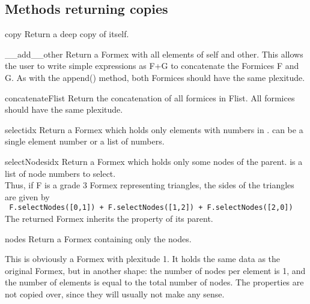 {{\subsection{Methods returning copies}

\begin{methoddesc}{copy}{}
Return a deep copy of itself.
\end{methoddesc}


\begin{methoddesc}{__add__}{other}
Return a Formex with all elements of self and other. This allows the user to write simple expressions as F+G to concatenate the Formices F and G. As with the append() method, both Formices should have the same plexitude.
\end{methoddesc}


\begin{methoddesc}{concatenate}{Flist}
Return the concatenation of all formices in Flist. All formices should have the same plexitude. \classmethod 
\end{methoddesc}


\begin{methoddesc}{select}{idx}
Return a Formex which holds only elements with numbers in .
 can be a single element number or a list of numbers.
\end{methoddesc}

\begin{methoddesc}{selectNodes}{idx}
Return a Formex which holds only some nodes of the parent.  is a list of node numbers to select.\\
Thus, if F is a grade 3 Formex representing triangles, the sides of the triangles are given by\\
\verb? F.selectNodes([0,1]) + F.selectNodes([1,2]) + F.selectNodes([2,0]) ?\\
The returned Formex inherits the property of its parent.
\end{methoddesc}

\begin{methoddesc}{nodes}{}
Return a Formex containing only the nodes.

This is obviously a Formex with plexitude 1. It holds the same data as the original Formex, but in another shape: the number of nodes per element is 1, and the number of elements is equal to the total number of nodes. The properties are not copied over, since they will usually not make any sense.
\end{methoddesc}

}}
